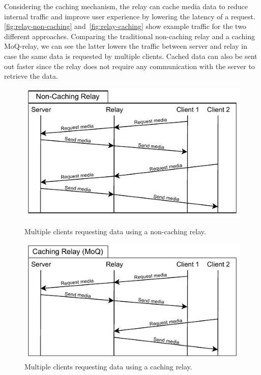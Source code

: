 Considering the caching mechanism, the relay can cache media data to reduce internal traffic 
and improve user experience by lowering the latency of a request.
\autoref{fig:relay-non-caching} and~\autoref{fig:relay-caching} show example traffic for the 
two different approaches.
Comparing the traditional non-caching relay and a caching MoQ-relay, we can see the latter lowers 
the traffic between server and relay in case the same data is requested by multiple clients.
Cached data can also be sent out faster since the relay does not require any communication with 
the server to retrieve the data.

\vspace{0.5cm}
\begin{figure}[H]

    \begin{minipage}{\textwidth}
        \centering
        \includegraphics[width=0.6\linewidth]{figures/02_background/relay-non-caching.drawio.pdf}
        \caption[Request to non-caching relay]{Multiple clients requesting data using a non-caching relay.}\label{fig:relay-non-caching}
    \end{minipage}\hfill

    \vspace{0.5cm}
    
    \begin{minipage}{\textwidth}
        \centering
        \includegraphics[width=0.6\linewidth]{figures/02_background/relay-caching.drawio.pdf}
        \caption[Request to caching relay]{Multiple clients requesting data using a caching relay.}\label{fig:relay-caching}
    \end{minipage}
    
\end{figure}

